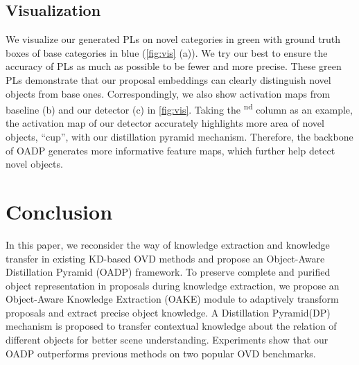 \documentclass[10pt,twocolumn,letterpaper]{article}
\def\OADP{Object-Aware Distillation Pyramid}
\def\OAKE{Object-Aware Knowledge Extraction}
\def\DP{Distillation Pyramid}
\begin{document}
\subsection{Visualization}

We visualize our generated PLs on novel categories in green with ground truth boxes of base categories in blue (\cref{fig:vis} (a)).
We try our best to ensure the accuracy of PLs as much as possible to be fewer and more precise.
These green PLs demonstrate that our proposal embeddings can clearly distinguish novel objects from base ones.
Correspondingly, we also show activation maps from baseline (b) and our detector (c) in \cref{fig:vis}.
Taking the \textsuperscript{nd} column as an example, the activation map of our detector accurately highlights more area of novel objects, \ie ``cup'', with our distillation pyramid mechanism.
Therefore, the backbone of OADP generates
more informative feature maps, which further help detect novel objects.
 
\section{Conclusion}

In this paper, we reconsider the way of knowledge extraction and knowledge transfer in existing KD-based OVD methods and propose an \OADP{} (OADP) framework.
To preserve complete and purified object representation in proposals during knowledge extraction, we propose an \OAKE{} (OAKE) module to adaptively transform proposals and extract precise object knowledge.
A \DP (DP) mechanism is proposed to transfer contextual knowledge about the relation of different objects for better scene understanding.
Experiments show that our OADP outperforms previous methods on two popular OVD benchmarks.
 
{
    \small
    
    
}
\end{document}
